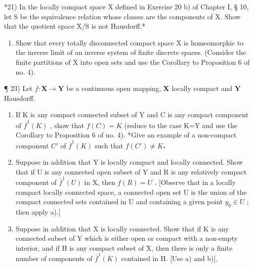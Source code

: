*21) In the locally compact space X defined in Exercise 20 b) of Chapter I, § 10, let S be the equivalence relation whose classes are the components of X. Show that the quotient space X/S is not Hausdorff.*

\begin{enumerate}
\def\labelenumi{\arabic{enumi})}
\setcounter{enumi}{21}
\tightlist
\item
  Show that every totally disconnected compact space X is homeomorphic to the inverse limit of an inverse system of finite discrete spaces. (Consider the finite partitions of X into open sets and use the Corollary to Proposition 6 of no. 4).
\end{enumerate}

¶ 23) Let \(f: \mathbf{X} \to \mathbf{Y}\) be a continuous open mapping, \(\mathbf{X}\) locally compact and \(\mathbf{Y}\) Hausdorff.

\begin{enumerate}
\def\labelenumi{\alph{enumi})}
\item
  If K is any compact connected subset of Y and C is any compact component of \(\overline{f}^{1}(K)\) , show that \(f(C)=K\) (reduce to the case K=Y and use the Corollary to Proposition 6 of no. 4). *Give an example of a non-compact component \(C'\) of \(\overline{f}^{1}(K)\) such that \(f(C')\neq K_*\)
\item
  Suppose in addition that Y is locally compact and locally connected. Show that if U is any connected open subset of Y and R is any relatively compact component of \(\overline{f}^{1}(U)\) in X, then \(f(R)=U\) . {[}Observe that in a locally compact locally connected space, a connected open set U is the union of the compact connected sets contained in U and containing a given point \(y_{0}\in U\) ; then apply a).{]}
\item
  Suppose in addition that X is locally connected. Show that if K is any connected subset of Y which is either open or compact with a non-empty interior, and if H is any compact subset of X, then there is only a finite number of components of \(\overline{f}^{1}(K)\) contained in H. {[}Use a) and b){]}.
\end{enumerate}

